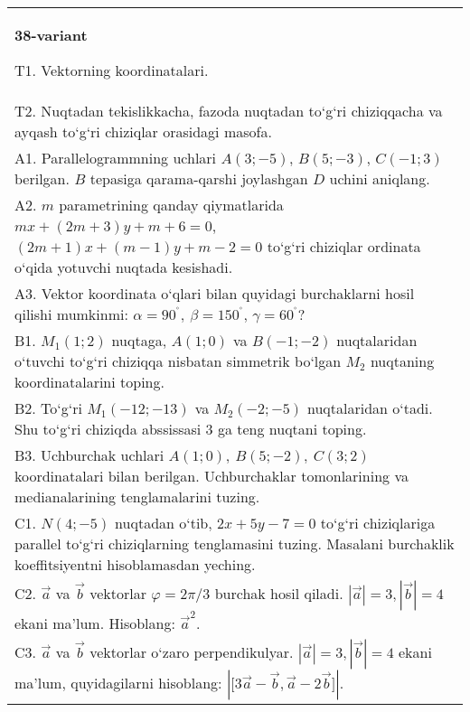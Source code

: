 \documentclass{article}
\begin{document}
\begin{tabular}{m{17cm}}
\textbf{38-variant}

T1. 
Vektorning koordinatalari.
 \\
T2. 
Nuqtadan tekislikkacha, fazoda nuqtadan to‘g‘ri chiziqqacha va ayqash to‘g‘ri chiziqlar orasidagi masofa.
 \\
A1. 
Parallelogrammning uchlari
$A (3;-5) $, $B (5;-3) $, $C (-1;3) $ berilgan. $B$ tepasiga
qarama-qarshi joylashgan $D$ uchini aniqlang.
 \\
A2. 
$m$ parametrining qanday qiymatlarida
$mx+ (2m+3) y+m+6=0$, $ (2m+1) x+ (m-1) y+m-2=0$ to‘g‘ri chiziqlar ordinata
o‘qida yotuvchi nuqtada kesishadi.
 \\
A3. 
Vektor koordinata o‘qlari bilan quyidagi burchaklarni hosil qilishi
mumkinmi: $\alpha = 90^{{^\circ}},\ \beta = 150^{{^\circ}}$,
$\gamma = 60^{{^\circ}}?$
 \\
B1. 
\(M_{1} (1;2) \) nuqtaga, \(A (1;0) \) va \(B (-1;-2) \)
nuqtalaridan o‘tuvchi to‘g‘ri chiziqqa nisbatan simmetrik bo‘lgan \(M_{2}\) nuqtaning koordinatalarini toping.
 \\
B2. 
To‘g‘ri \(M_{1} (-12;-13) \) va \(M_{2} (-2;-5) \)
nuqtalaridan o‘tadi. Shu to‘g‘ri chiziqda abssissasi 3 ga teng nuqtani toping.
 \\
B3. 
Uchburchak uchlari \(A (1;0),\ B (5;-2),\ C (3;2) \)
koordinatalari bilan berilgan. Uchburchaklar tomonlarining va
medianalarining tenglamalarini tuzing.
 \\
C1. 
\(N (4;-5) \) nuqtadan o‘tib, $2x+5y-7=0$
to‘g‘ri chiziqlariga parallel to‘g‘ri chiziqlarning tenglamasini tuzing. Masalani burchaklik
koeffitsiyentni hisoblamasdan yeching.
 \\
C2. 
$\vec{a}$ va $\vec{b}$ vektorlar $\varphi = 2\pi/3$ burchak hosil qiladi. $|\vec{a}| = 3,|\vec{b}| = 4$ ekani ma’lum. Hisoblang:
${\vec{a}}^{2}$.
 \\
C3. 
$\vec{a}$ va $\vec{b}$ vektorlar o‘zaro perpendikulyar. $|\vec{a}| = 3,|\vec{b}| = 4$ ekani ma’lum, quyidagilarni hisoblang:
$|\lbrack 3\vec{a} - \vec{b},\vec{a}-2\vec{b}\rbrack|$.
 \\

\end{tabular}
\vspace{1cm}
\end{document}
